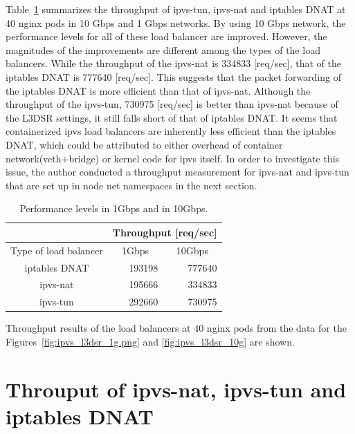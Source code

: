 Table~\ref{table:nat_tun_dnat_1g_10g} summarizes the throughput of ipvs-tun, ipvs-nat and iptables DNAT at 40 nginx pods in 10 Gbps and 1 Gbps networks.
By using 10 Gbps network, the performance levels for all of these load balancer are improved.
However, the magnitudes of the improvements are different among the types of the load balancers.
While the throughput of the ipvs-nat is 334833 [req/sec], that of the iptables DNAT is 777640 [req/sec].
This suggests that the packet forwarding of the iptables DNAT is more efficient than that of ipvs-nat.
Although the throughput of the ipvs-tun, 730975 [req/sec] is better than ipvs-nat because of the L3DSR settings, it still falls short of that of iptables DNAT.
It seems that containerized ipvs load balancers are inherently less efficient than the iptables DNAT, which could be attributed to either overhead of container network(veth+bridge)\cite{zhao2017performance,ruiz2015performance} or kernel code for ipvs itself.
In order to investigate this issue, the author conducted a throughput measurement for ipvs-nat and ipvs-tun that are set up in node net namespaces in the next section.

\begin{table}[H]
  \centering
  \begin{tabular}{|l|r|r|}
    \hline
    & \multicolumn{2}{c|}{Throughput {[}req/sec{]}} \\ \hline
    Type of load balancer & \multicolumn{1}{c|}{1Gbps} & \multicolumn{1}{c|}{\cellcolor[HTML]{ECF4FF}10Gbps} \\ \hline
    \multicolumn{1}{|c|}{iptables DNAT} & 193198 & \cellcolor[HTML]{ECF4FF}777640 \\ \hline
    \multicolumn{1}{|c|}{ipvs-nat} & 195666 & \cellcolor[HTML]{ECF4FF}334833 \\ \hline
    \multicolumn{1}{|c|}{ipvs-tun} & 292660 & \cellcolor[HTML]{ECF4FF}730975 \\ \hline
  \end{tabular}
  \caption{Performance levels in 1Gbps and in 10Gbps.}
  \raggedright
  Throughput results of the load balancers at 40 nginx pods from the data for the Figures~\ref{fig:ipvs_l3dsr_1g.png} and \ref{fig:ipvs_l3dsr_10g} are shown.
  \label{table:nat_tun_dnat_1g_10g}
\end{table}

\FloatBarrier
\section{Throuput of ipvs-nat, ipvs-tun and iptables DNAT}

